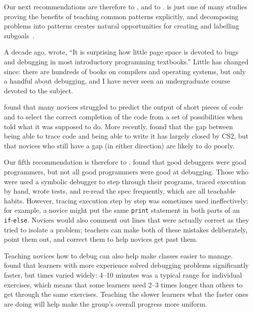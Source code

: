 Our next recommendations are therefore
to ,
and to .
\cite{Mull2007b} is just one of many studies proving the benefits of teaching common patterns explicitly,
and decomposing problems into patterns creates natural opportunities
for creating and labelling subgoals~\cite{Marg2012,Marg2016}.


A decade ago,
\cite{McCa2008} wrote,
``It is surprising how little page space is devoted to bugs and debugging
in most introductory programming textbooks.''
Little has changed since:
there are hundreds of books on compilers and operating systems,
but only a handful about debugging,
and I have never seen an undergraduate course devoted to the subject.

\cite{List2004,List2009} found that many novices struggled to predict the output of short pieces of code
and to select the correct completion of the code from a set of possibilities
when told what it was supposed to do.
More recently,
\cite{Harr2018} found that the gap between being able to trace code and being able to write it has largely closed by CS2,
but that novices who still have a gap (in either direction) are likely to do poorly.

Our fifth recommendation is therefore to .
\cite{Fitz2008,Murp2008} found that good debuggers were good programmers,
but not all good programmers were good at debugging.
Those who were used a symbolic debugger to step through their programs,
traced execution by hand,
wrote tests,
and re-read the spec frequently,
which are all teachable habits.
However,
tracing execution step by step was sometimes used ineffectively:
for example,
a novice might put the same \texttt{print} statement in both parts of an \texttt{if}-\texttt{else}.
Novices would also comment out lines that were actually correct as they tried to isolate a problem;
teachers can make both of these mistakes deliberately,
point them out,
and correct them to help novices get past them.

Teaching novices how to debug can also help make classes easier to manage.
\cite{Alqa2017} found that learners with more experience solved debugging problems significantly faster,
but times varied widely:
4--10 minutes was a typical range for individual exercises,
which means that some learners need 2--3 times longer than others to get through the same exercises.
Teaching the slower learners what the faster ones are doing
will help make the group's overall progress more uniform.

